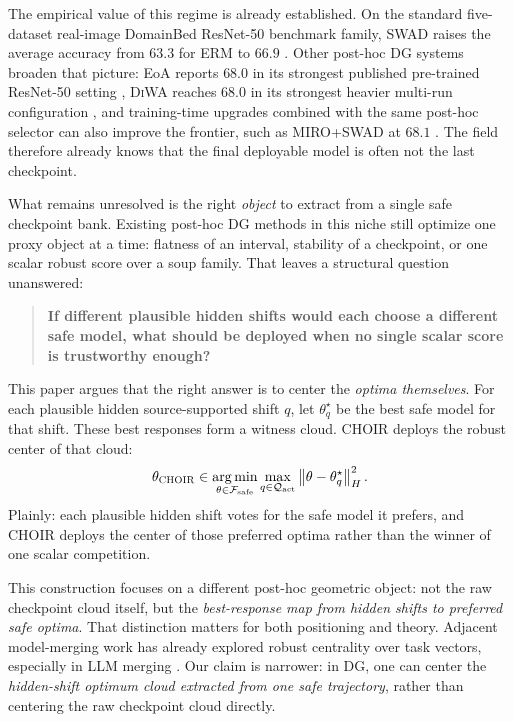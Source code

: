 \documentclass{article}
\newcommand{\cF}{\mathcal{F}}
\newcommand{\cQ}{\mathcal{Q}}
\newcommand{\argmin}{\operatorname*{arg\,min}}
\newcommand{\choir}{\textup{\textsc{CHOIR}}}
\newcommand{\swad}{\textup{\textsc{SWAD}}}
\newcommand{\diwa}{\textup{\textsc{DiWA}}}
\newcommand{\miro}{\textup{\textsc{MIRO}}}
\newcommand{\erm}{\textup{\textsc{ERM}}}
\newcommand{\norm}[1]{\left\lVert #1 \right\rVert}
\newcommand{\safe}{\mathrm{safe}}
\newcommand{\act}{\mathrm{act}}
\begin{document}
The empirical value of this regime is already established. On the standard five-dataset real-image DomainBed ResNet-50 benchmark family, \swad{} raises the average accuracy from \(63.3\) for \erm{} to \(66.9\) \citep{cha2021swad}. Other post-hoc DG systems broaden that picture: EoA reports \(68.0\) in its strongest published pre-trained ResNet-50 setting \citep{arpit2021ensemble}, \diwa{} reaches \(68.0\) in its strongest heavier multi-run configuration \citep{rame2022diwa}, and training-time upgrades combined with the same post-hoc selector can also improve the frontier, such as \miro{}+\swad{} at \(68.1\) \citep{cha2022miro}. The field therefore already knows that the final deployable model is often not the last checkpoint.

What remains unresolved is the right \emph{object} to extract from a single safe checkpoint bank. Existing post-hoc DG methods in this niche still optimize one proxy object at a time: flatness of an interval, stability of a checkpoint, or one scalar robust score over a soup family. That leaves a structural question unanswered:
\begin{quote}
\textbf{If different plausible hidden shifts would each choose a different safe model, what should be deployed when no single scalar score is trustworthy enough?}
\end{quote}

This paper argues that the right answer is to center the \emph{optima themselves}. For each plausible hidden source-supported shift \(q\), let \(\theta_q^\star\) be the best safe model for that shift. These best responses form a witness cloud. \choir{} deploys the robust center of that cloud:
\[
\theta_{\choir}
\in
\argmin_{\theta\in\cF_{\safe}}
\max_{q\in\cQ_{\act}}
\norm{\theta-\theta_q^\star}_H^2.
\]
Plainly: each plausible hidden shift votes for the safe model it prefers, and \choir{} deploys the center of those preferred optima rather than the winner of one scalar competition.

This construction focuses on a different post-hoc geometric object: not the raw checkpoint cloud itself, but the \emph{best-response map from hidden shifts to preferred safe optima}. That distinction matters for both positioning and theory. Adjacent model-merging work has already explored robust centrality over task vectors, especially in LLM merging \citep{gupta2024geomtask}. Our claim is narrower: in DG, one can center the \emph{hidden-shift optimum cloud extracted from one safe trajectory}, rather than centering the raw checkpoint cloud directly.
\end{document}
